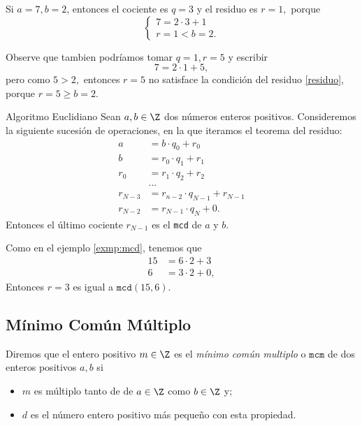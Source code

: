 	\begin{ejemplo}
		Si $a=7,b=2$, entonces el cociente es $q=3$ y el residuo es $r=1,$ porque
		$$\begin{cases}
			7=2\cdot 3+1\\ {r=1}<{b=2}.     
		\end{cases}
		$$
	\end{ejemplo}

		Observe que tambien podr\'iamos tomar $q=1, r=5$ y escribir $$7=2\cdot 1+5,$$ pero como ${5}>{2},$ entonces $r=5$ no 
		satisface la condici\'on del residuo \eqref{residuo}, porque ${r=5}\geq {b=2}.$

	\begin{algoritmo}{Algoritmo Euclidiano}
		Sean $a,b\in \Z$ dos números enteros positivos. Consideremos la siguiente sucesi\'on de operaciones, en la que iteramos el teorema del residuo:
		\begin{align*}
			a&=b\cdot q_{0}+r_{0} \\
			b&=r_{0}\cdot q_{1}+r_{1}\\
			r_{0}&=r_{1}\cdot q_{2}+r_{2}\\
			&...\\
			r_{N-3}&=r_{n-2}\cdot q_{N-1}+r_{N-1}\\
			r_{N-2}&=r_{N-1}\cdot q_{N}+0.
		\end{align*}
		Entonces el último cociente $r_{N-1}$ es el \texttt{mcd} de $a$ y $b.$
	\end{algoritmo}
	
	
	Como en el ejemplo \ref{exmp:mcd}, tenemos que 
	\begin{align*}
		15&=6\cdot 2+3\\ 
		6&=3\cdot 2+0, 
	\end{align*}
	Entonces $r=3$ es igual a $\texttt{mcd}(15,6)$.



\subsection{M\'inimo Común Múltiplo}


	\begin{definicion}
		\label{mcm} 
		Diremos que el entero positivo $m\in \Z$ es el \emph{m\'inimo común multiplo} o $\texttt{mcm}$ de dos enteros positivos $a,b$ si
		\begin{itemize}
			\item $m$ es múltiplo tanto de de $a\in \Z$ como $b\in \Z$ y;
			\item $d$ es el número entero positivo más pequeño con esta propiedad.
		\end{itemize}		
	\end{definicion}
	

